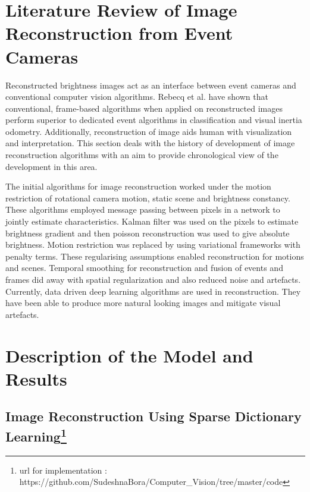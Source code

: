 \documentclass[10pt]{report}
\begin{document}
\section{Literature Review of Image Reconstruction from Event Cameras}
\label{sec:literature}
Reconstructed brightness images act as an interface between event cameras and conventional computer vision algorithms. 
Rebecq et al. \cite{Rebecq19cvpr} have shown that conventional, frame-based algorithms when applied on reconstructed images perform superior to dedicated event algorithms in classification and visual inertia odometry. Additionally, reconstruction of image aids human with visualization and interpretation. This section deals with the history of development of image reconstruction algorithms with an aim to provide chronological view of the development in this area. 

The initial algorithms \cite{Cook11ijcnn} \cite{Kim14bmvc} for image reconstruction worked under the motion restriction of rotational camera motion, static scene and brightness constancy. These algorithms employed message passing between pixels in a network to jointly estimate characteristics. Kalman filter was used on the pixels to estimate brightness gradient and then poisson reconstruction was used to give absolute brightness. Motion restriction was replaced by using variational frameworks with penalty terms. These regularising assumptions \cite{Manderscheid19cvpr} enabled reconstruction for motions and scenes. Temporal smoothing \cite{Rose73book} for reconstruction and fusion of events and frames did away with spatial regularization and also reduced noise and artefacts. Currently, data driven deep learning algorithms \cite{Rebecq19pami} \cite{Mueggler17bmvc} are used in reconstruction. They have been able to produce more natural looking images and mitigate visual artefacts.

\section{Description of the Model and Results}
\label{sec:description}

\subsection[Image Reconstruction Using Sparse Dictionary Learning]{Image Reconstruction Using Sparse Dictionary Learning\footnote{ url for implementation : https://github.com/SudeshnaBora/Computer\_Vision/tree/master/code }}
\label{sec:dictionary-learning}
\end{document}
